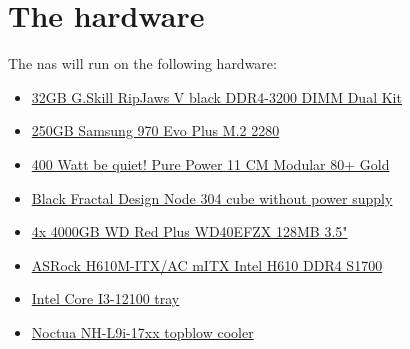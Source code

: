

\section{The hardware}

The \gls{nas} will run on the following hardware:

\begin{itemize}
    \item \href{https://www.gskill.com/product/165/184/1536110922/F4-3200C16D-32GVK}{32GB G.Skill RipJaws V black DDR4-3200 DIMM Dual Kit}
    \item \href{https://www.samsung.com/de/memory-storage/nvme-ssd/970-evo-nvme-m-2-ssd-250gb-mz-v7e250bw/}{250GB Samsung 970 Evo Plus M.2 2280}
    \item \href{https://www.bequiet.com/de/powersupply/1539}{400 Watt be quiet! Pure Power 11 CM Modular 80+ Gold}
    \item \href{https://www.fractal-design.com/de/products/cases/node/node-304/black/}{Black Fractal Design Node 304 cube without power supply}
    \item \href{https://www.westerndigital.com/de-de/products/internal-drives/wd-red-plus-sata-3-5-hdd#WD40EFZX}{4x 4000GB WD Red Plus WD40EFZX 128MB 3.5"}
    \item \href{https://www.asrock.com/MB/Intel/H610M-ITXac/index.de.asp}{ASRock H610M-ITX/AC mITX Intel H610 DDR4 S1700}
    \item \href{https://ark.intel.com/content/www/us/en/ark/products/134584/intel-core-i312100-processor-12m-cache-up-to-4-30-ghz.html}{Intel Core I3-12100 tray}
    \item \href{https://noctua.at/en/nh-l9i-17xx}{Noctua NH-L9i-17xx topblow cooler}
\end{itemize}
